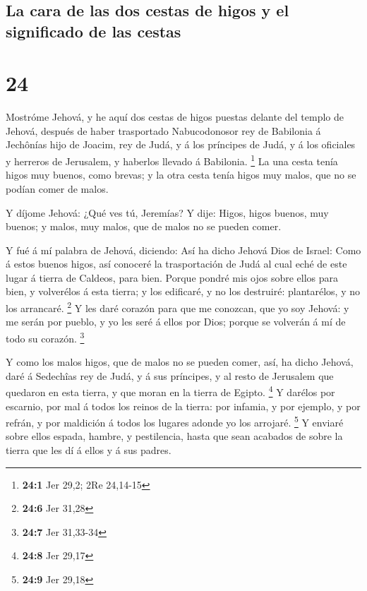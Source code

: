 \hypertarget{la-cara-de-las-dos-cestas-de-higos-y-el-significado-de-las-cestas}{%
\subsection{La cara de las dos cestas de higos y el significado de las
cestas}\label{la-cara-de-las-dos-cestas-de-higos-y-el-significado-de-las-cestas}}

\hypertarget{section-23}{%
\section{24}\label{section-23}}

 Mostróme Jehová, y he aquí dos cestas de higos puestas
delante del templo de Jehová, después de haber trasportado Nabucodonosor
rey de Babilonia á Jechônías hijo de Joacim, rey de Judá, y á los
príncipes de Judá, y á los oficiales y herreros de Jerusalem, y haberlos
llevado á Babilonia. \footnote{\textbf{24:1} Jer 29,2; 2Re 24,14-15}
 La una cesta tenía higos muy buenos, como brevas; y la
otra cesta tenía higos muy malos, que no se podían comer de malos.

 Y díjome Jehová: ¿Qué ves tú, Jeremías? Y dije: Higos,
higos buenos, muy buenos; y malos, muy malos, que de malos no se pueden
comer.

 Y fué á mí palabra de Jehová, diciendo: 
Así ha dicho Jehová Dios de Israel: Como á estos buenos higos, así
conoceré la trasportación de Judá al cual eché de este lugar á tierra de
Caldeos, para bien.  Porque pondré mis ojos sobre ellos
para bien, y volverélos á esta tierra; y los edificaré, y no los
destruiré: plantarélos, y no los arrancaré. \footnote{\textbf{24:6} Jer
  31,28}  Y les daré corazón para que me conozcan, que yo
soy Jehová: y me serán por pueblo, y yo les seré á ellos por Dios;
porque se volverán á mí de todo su corazón. \footnote{\textbf{24:7} Jer
  31,33-34}

 Y como los malos higos, que de malos no se pueden comer,
así, ha dicho Jehová, daré á Sedechîas rey de Judá, y á sus príncipes, y
al resto de Jerusalem que quedaron en esta tierra, y que moran en la
tierra de Egipto. \footnote{\textbf{24:8} Jer 29,17}  Y
darélos por escarnio, por mal á todos los reinos de la tierra: por
infamia, y por ejemplo, y por refrán, y por maldición á todos los
lugares adonde yo los arrojaré. \footnote{\textbf{24:9} Jer 29,18}
 Y enviaré sobre ellos espada, hambre, y pestilencia,
hasta que sean acabados de sobre la tierra que les dí á ellos y á sus
padres.

